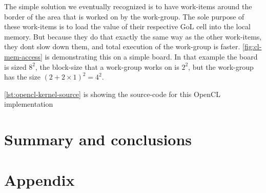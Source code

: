 \documentclass[a4paper,english,12pt,twoside=false]{scrartcl} %
\begin{document}
The simple solution we eventually recognized is to have work-items around the border of the area that is worked on by the work-group.
The sole purpose of these work-items is to load the value of their respective GoL cell into the local memory. 
But because they do that exactly the same way as the other work-items, they dont slow down them, and total execution of the work-group is faster.
\autoref{fig:cl-mem-access} is demonstrating this on a simple board. 
In that example the board is sized $8^2$, the block-size that a work-group works on is $2^2$, but the work-group has the size $(2 + 2\times 1)^2 = 4^2$.

\autoref{lst:opencl-kernel-source} is showing the source-code for this OpenCL implementation
{
    \centering
    \label{lst:opencl-kernel-source}
    
}

\section{Summary and conclusions}

\section{Appendix}
\end{document}
